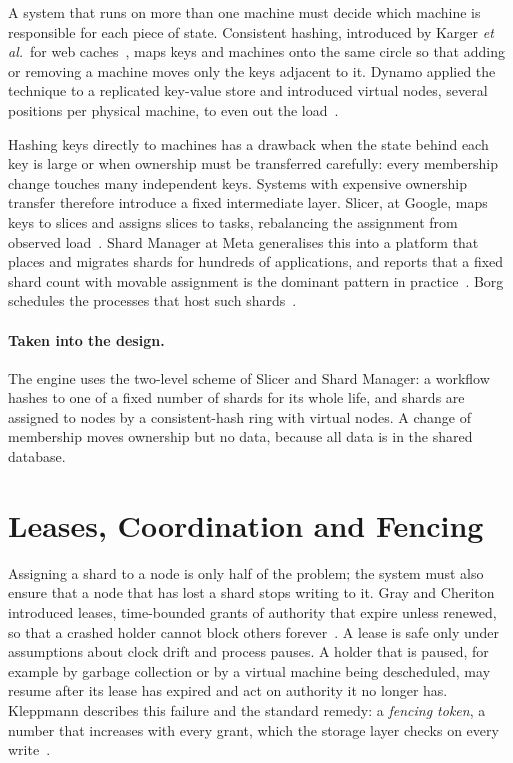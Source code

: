 A system that runs on more than one machine must decide which machine is
responsible for each piece of state. Consistent hashing, introduced by Karger
\emph{et al.}\ for web caches~\cite{consistenthash1997}, maps keys and
machines onto the same circle so that adding or removing a machine moves only
the keys adjacent to it. Dynamo applied the technique to a replicated
key-value store and introduced virtual nodes, several positions per physical
machine, to even out the load~\cite{dynamo2007}.

Hashing keys directly to machines has a drawback when the state behind each
key is large or when ownership must be transferred carefully: every
membership change touches many independent keys. Systems with expensive
ownership transfer therefore introduce a fixed intermediate layer. Slicer, at
Google, maps keys to slices and assigns slices to tasks, rebalancing the
assignment from observed load~\cite{slicer2016}. Shard Manager at Meta
generalises this into a platform that places and migrates shards for hundreds
of applications, and reports that a fixed shard count with movable assignment
is the dominant pattern in practice~\cite{shardmanager2021}. Borg schedules
the processes that host such shards~\cite{borg2015}.

\paragraph{Taken into the design.} The engine uses the two-level scheme of
Slicer and Shard Manager: a workflow hashes to one of a fixed number of shards
for its whole life, and shards are assigned to nodes by a consistent-hash ring
with virtual nodes. A change of membership moves ownership but no data,
because all data is in the shared database.

\section{Leases, Coordination and Fencing}

Assigning a shard to a node is only half of the problem; the system must also
ensure that a node that has lost a shard stops writing to it. Gray and
Cheriton introduced leases, time-bounded grants of authority that expire
unless renewed, so that a crashed holder cannot block others
forever~\cite{leases1989}. A lease is safe only under assumptions about clock
drift and process pauses. A holder that is paused, for example by garbage
collection or by a virtual machine being descheduled, may resume after its
lease has expired and act on authority it no longer has. Kleppmann describes
this failure and the standard remedy: a \emph{fencing token}, a number that
increases with every grant, which the storage layer checks on every
write~\cite{kleppmann2017}.

